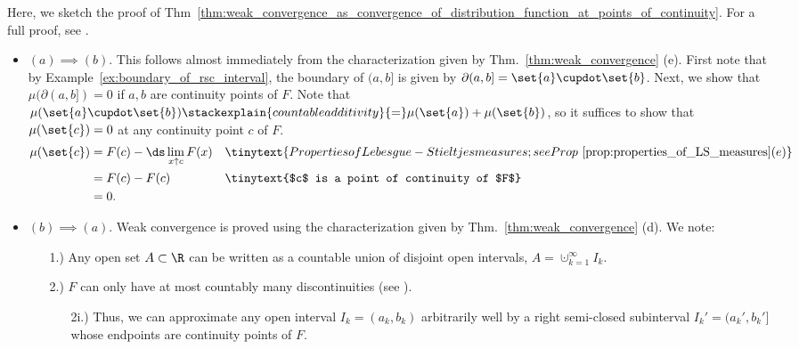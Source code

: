 \documentclass{article} %
\begin{document}
\begin{remark}
Here, we sketch the proof of Thm~\ref{thm:weak_convergence_as_convergence_of_distribution_function_at_points_of_continuity}.  For a full proof, see \cite{ash2000probability}.	
\begin{itemize}
\item $\boxed{(a) \implies (b)}$. This follows almost immediately from the characterization given by  Thm.~\ref{thm:weak_convergence} (e). First note that by Example~\ref{ex:boundary_of_rsc_interval}, the boundary of $(a,b]$ is given by $\partial (a,b] = \set{a} \cupdot \set{b}$.  Next, we show that $\mu(\partial (a,b]) =0$ if $a,b$ are continuity points of $F$.   Note that $\mu(\set{a} \cupdot \set{b}) \stackexplain{countable additivity}{=} \mu(\set{a}) + \mu(\set{b})$, so it suffices to show that $\mu(\set{c})=0$ at any continuity point $c$ of $F$. 
\begin{align*}
\mu(\set{c}) &= F(c) - \ds\lim_{x \uparrow c} F(x) && \tinytext{Properties of Lebesgue-Stieltjes measures; see Prop~\ref{prop:properties_of_LS_measures} (e) } \\
&= F(c) - F(c) && \tinytext{$c$ is a point of continuity of $F$} \\
&=0.
\end{align*}

\item $\boxed{(b) \implies (a)}$. Weak convergence is proved using the characterization given by  Thm.~\ref{thm:weak_convergence} (d).  We note:
\begin{enumerate}
	\item[1.)] Any open set $A \subset \R$ can be written as a countable union of disjoint open intervals, $A = \cupdot_{k=1}^\infty I_k$.
	\item[2.)] $F$ can only have at most countably many discontinuities (see \cite[Sec.~1.5, HW~9]{ash2000probability}).
	\begin{enumerate}
	\item[2i.)] Thus, we can approximate any open interval $I_k=(a_k,b_k)$ arbitrarily well by a right semi-closed subinterval $I_k'=(a_k',b_k']$ whose endpoints are continuity points of $F$.  
	

\end{enumerate}
\end{enumerate}
\end{itemize}
\end{remark}
\end{document}

